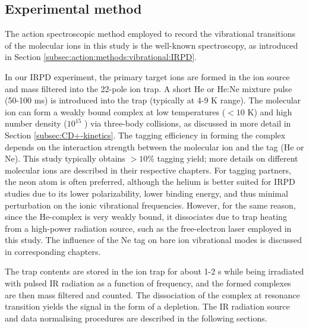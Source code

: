 \subsection{Experimental method}
\label{subsec:IRPD}

The action spectroscopic method employed to record the vibrational transitions of the molecular ions in this study is the well-known  spectroscopy, as introduced in Section \ref{subsec:action:methods:vibrational:IRPD}.

In our IRPD experiment, the primary target ions are formed in the ion source and mass filtered into the 22-pole ion trap. A short He or He:Ne mixture pulse (50-100 ms) is introduced into the trap (typically at 4-9 K range). The molecular ion can form a weakly bound complex at low temperatures ($< 10$ K) and high number density ($10^{15}$ \percc ) via three-body collisions, as discussed in more detail in Section \ref{subsec:CD+-kinetics}. The tagging efficiency in forming the complex depends on the interaction strength between the molecular ion and the tag (He or Ne). This study typically obtains $> 10 \%$ tagging yield; more details on different molecular ions are described in their respective chapters. For tagging partners, the neon atom is often preferred, although the helium is better suited for IRPD studies due to its lower polarizability, lower binding energy, and thus  minimal perturbation on the ionic vibrational frequencies. However, for the same reason, since the He-complex is very weakly bound, it dissociates due to trap heating from a high-power radiation source, such as the free-electron laser employed in this study. The influence of the Ne tag on bare ion vibrational modes is discussed in corresponding chapters.

The trap contents are stored in the ion trap for about 1-2 s while being irradiated with pulsed IR radiation as a function of frequency, and the formed complexes are then mass filtered and counted. The dissociation of the complex at resonance transition yields the signal in the form of a depletion. The IR radiation source and data normalising procedures are described in the following sections.
